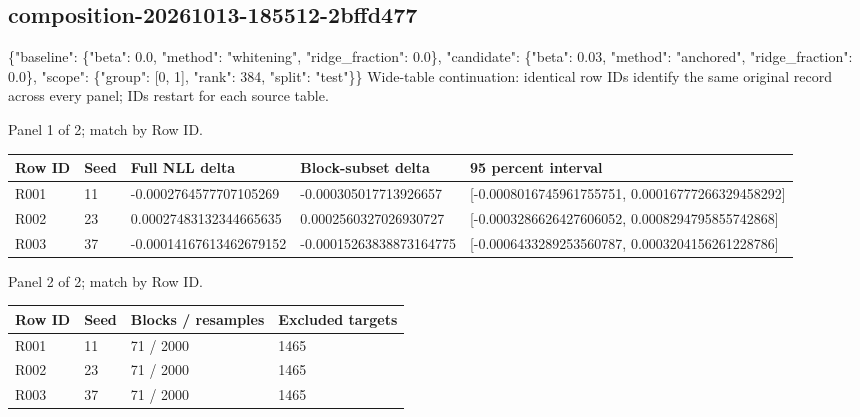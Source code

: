 \documentclass[10pt]{article}
\begin{document}
\subsection{composition-20261013-185512-2bffd477}
\{"baseline": \{"beta": 0.0, "method": "whitening", "ridge\_fraction": 0.0\}, "candidate": \{"beta": 0.03, "method": "anchored", "ridge\_fraction": 0.0\}, "scope": \{"group": [0, 1], "rank": 384, "split": "test"\}\}
Wide-table continuation: identical row IDs identify the same original record across every panel; IDs restart for each source table.
\par\noindent Panel 1 of 2; match by Row ID.
{\scriptsize\setlength{\tabcolsep}{2pt}
\begin{longtable}{p{}p{}p{}p{}p{}}
Row ID & Seed & Full NLL delta & Block-subset delta & 95 percent interval \\
\hline\endhead
R001 & 11 & -0.0002764577707105269 & -0.000305017713926657 & [-0.0008016745961755751, 0.00016777266329458292] \\
R002 & 23 & 0.00027483132344665635 & 0.0002560327026930727 & [-0.0003286626427606052, 0.0008294795855742868] \\
R003 & 37 & -0.00014167613462679152 & -0.00015263838873164775 & [-0.0006433289253560787, 0.0003204156261228786] \\
\end{longtable}}
\par\noindent Panel 2 of 2; match by Row ID.
{\scriptsize\setlength{\tabcolsep}{2pt}
\begin{longtable}{p{}p{}p{}p{}}
Row ID & Seed & Blocks / resamples & Excluded targets \\
\hline\endhead
R001 & 11 & 71 / 2000 & 1465 \\
R002 & 23 & 71 / 2000 & 1465 \\
R003 & 37 & 71 / 2000 & 1465 \\
\end{longtable}}
\end{document}
